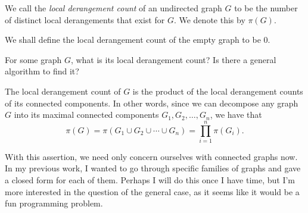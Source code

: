 \documentclass[a5paper, 10pt]{article}
\begin{document}
\begin{definition}
    We call the \textit{local derangement count} of an undirected graph \( G \)
    to be the number of distinct local derangements that exist for \( G \). We
    denote this by \( \pi(G) \).
\end{definition}

We shall define the local derangement count of the empty graph to be \( 0 \).

\begin{chirpbox}
\begin{problem}
    For some graph \( G \), what is its local derangement count? Is there a general algorithm to find it?
\end{problem}
\end{chirpbox}

\begin{observation}
    The local derangement count of \( G \) is the product of the local
    derangement counts of its connected components. In other words, since
    we can decompose any graph \( G \) into its maximal connected components \(
    G_1, G_2, \ldots, G_n \), we have that
    \[
        \pi(G) = \pi(G_1 \cup G_2 \cup \cdots \cup G_n) = \prod_{i = 1}^{n} \pi(G_i)
    .\]
\end{observation}

With this assertion, we need only concern ourselves with connected graphs now.
In my previous work, I wanted to go through specific families of graphs and
gave a closed form for each of them. Perhaps I will do this once I have time,
but I'm more interested in the question of the general case, as it seems like
it would be a fun programming problem.
\end{document}
